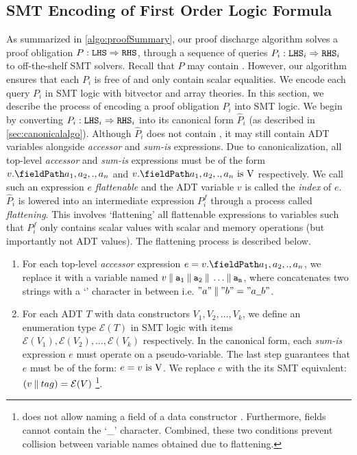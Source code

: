 \subsection{SMT Encoding of First Order Logic Formula}
\label{sec:smtencoding}
As summarized in \cref{algo:proofSummary}, our proof discharge algorithm solves a proof obligation $P: {\tt LHS}{} \Rightarrow {\tt RHS}{}$,
through a sequence of queries $P_i : {\tt LHS}{}_i \Rightarrow {\tt RHS}{}_i$ to off-the-shelf SMT solvers.
Recall that $P$ may contain \recursiveRelations{}.
However, our algorithm ensures that each $P_i$ is free of \recursiveRelations{} and only contain
scalar equalities.
We encode each query $P_i$ in SMT logic with bitvector and array theories.
In this section, we describe the process of encoding a proof obligation $P_i$ into SMT logic.
We begin by converting $P_i : {\tt LHS}{}_i \Rightarrow {\tt RHS}{}_i$ into its canonical form $\hat{P}_i$
(as described in \cref{sec:canonicalalgo}).
Although $\hat{P}_i$ does not contain \recursiveRelations{}, it may still contain
ADT variables alongside {\em accessor} and {\em sum-is} expressions.
Due to canonicalization, all top-level {\em accessor} and {\em sum-is} expressions must be of the form
$\prodAccess{v}{a_1,a_2,.,a_n}$ and $\sumIs{\prodAccess{v}{a_1,a_2,.,a_n}}{\textnormal{V}}$ respectively.
We call such an expression $e$ {\em flattenable} and the ADT variable $v$ is called the {\em index} of $e$.
$\hat{P}_i$ is lowered into an intermediate expression $P_i^f$ through a process called {\em flattening}.
This involves `flattening' all flattenable expressions to variables such that
$P_i^f$ only contains scalar values with scalar and memory operations (but importantly not ADT values).
The flattening process is described below.

\begin{enumerate}
\item For each top-level {\em accessor} expression $e = \prodAccess{v}{a_1,a_2,.,a_n}$, we replace it with a
variable named $v \mathbin\Vert{} {{\tt a_1}} \mathbin\Vert{} {{\tt a_2}} \mathbin\Vert{} \dots \mathbin\Vert{} {{\tt a_n}}$,
where \strcat{} concatenates two strings with a `\strsep{}' character in between i.e.
$"a" \strcat{} "b" = "a \strsep{} b"$.

\item For each ADT $T$ with data constructors $V_1,V_2,\dots,V_k$,
we define an enumeration type $\mathcal{E}(T)$ in SMT logic with items
$\mathcal{E}(V_1),\mathcal{E}(V_2),\dots,\mathcal{E}(V_k)$ respectively.
In the canonical form, each {\em sum-is} expression $e$ must operate on a pseudo-variable.
The last step guarantees that $e$ must be of the form: $e = v\ \mathrm{is}\ {\tt \textnormal{V}}$.
We replace $e$ with the its SMT equivalent: $(v \mathbin\Vert{} tag) = \mathcal{E}(V)$
\footnote{\SpecL{} does not allow naming a field of a data constructor .
Furthermore, fields cannot contain the `\_' character.
Combined, these two conditions prevent collision between variable names obtained due to flattening.}.
\end{enumerate}


